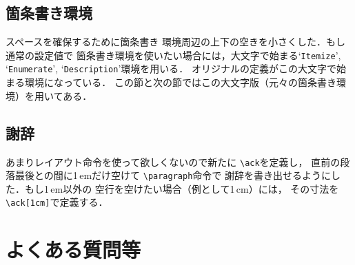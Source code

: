 \documentclass[onecolumn]{jsce}  %
\begin{document}
\subsection{箇条書き環境}

スペースを確保するために箇条書き
環境周辺の上下の空きを小さくした．もし通常の設定値で
箇条書き環境を使いたい場合には，大文字で始まる`{\tt Itemize}',
 `{\tt Enumerate}', `{\tt Description}'環境を用いる．
オリジナルの定義がこの大文字で始まる環境になっている．
この節と次の節ではこの大文字版（元々の箇条書き環境）を用いてある．

\subsection{謝辞}

あまりレイアウト命令を使って欲しくないので新たに \verb+\ack+を定義し，
直前の段落最後との間に1\,emだけ空けて \verb+\paragraph+命令で
謝辞を書き出せるようにした．もし1\,em以外の
空行を空けたい場合（例として1\,cm）には，
その寸法を \verb+\ack[1cm]+で定義する．


\section{よくある質問等}
\label{sec:qanda}
\end{document}
